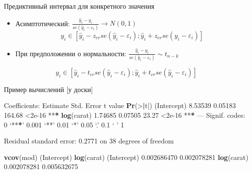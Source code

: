 \documentclass[ignorenonframetext,]{beamer}
\newenvironment{Shaded}{\begin{snugshade}}{\end{snugshade}}
\newcommand{\KeywordTok}[1]{\textcolor[rgb]{0.13,0.29,0.53}{\textbf{{#1}}}}
\newcommand{\DecValTok}[1]{\textcolor[rgb]{0.00,0.00,0.81}{{#1}}}
\newcommand{\FloatTok}[1]{\textcolor[rgb]{0.00,0.00,0.81}{{#1}}}
\newcommand{\StringTok}[1]{\textcolor[rgb]{0.31,0.60,0.02}{{#1}}}
\newcommand{\ErrorTok}[1]{\textbf{{#1}}}
\newcommand{\NormalTok}[1]{{#1}}
\begin{document}
\begin{frame}{Предиктивный интервал для конкретного значения}

\begin{itemize}
\item
  Асимптотический:
  \(\frac{\hat{y}_i - y_i }{se(\hat{y}_i-\varepsilon_i)} \to N(0,1)\) \[
  y_i  \in [\hat{y}_i - z_{cr} se(\hat{y}_i-\varepsilon_i);\hat{y}_i + z_{cr} se(\hat{y}_i-\varepsilon_i) ]
  \]
\item
  При предположении о нормальности:
  \(\frac{\hat{y}_i - y_i }{se(\hat{y}_i-\varepsilon_i)} \sim t_{n-k}\)
\end{itemize}

\[
y_i  \in [\hat{y}_i - t_{cr} se(\hat{y}_i-\varepsilon_i);\hat{y}_i + t_{cr} se(\hat{y}_i-\varepsilon_i) ]
\]

\end{frame}

\begin{frame}[fragile]{Пример вычислений {[}у доски{]}}

\begin{Shaded}
\begin{Highlighting}[]
\NormalTok{Coefficients:}
\StringTok{            }\NormalTok{Estimate Std. Error t value }\KeywordTok{Pr}\NormalTok{(>}\ErrorTok{|}\NormalTok{t|)    }
\NormalTok{(Intercept)  }\FloatTok{8.53539}    \FloatTok{0.05183}  \FloatTok{164.68}   \NormalTok{<}\FloatTok{2e-16} \NormalTok{**}\ErrorTok{*}
\KeywordTok{log}\NormalTok{(carat)   }\FloatTok{1.74685}    \FloatTok{0.07505}   \FloatTok{23.27}   \NormalTok{<}\FloatTok{2e-16} \NormalTok{**}\ErrorTok{*}
\NormalTok{---}
\NormalTok{Signif. codes:}\StringTok{  }\DecValTok{0} \NormalTok{‘**}\ErrorTok{*}\NormalTok{’ }\FloatTok{0.001} \NormalTok{‘**’ }\FloatTok{0.01} \NormalTok{‘*’ }\FloatTok{0.05} \NormalTok{‘.’ }\FloatTok{0.1} \NormalTok{‘ ’ }\DecValTok{1}

\NormalTok{Residual standard error:}\StringTok{ }\FloatTok{0.2771} \NormalTok{on }\DecValTok{38} \NormalTok{degrees of freedom}

\KeywordTok{vcov}\NormalTok{(mod)}
            \NormalTok{(Intercept)  }\KeywordTok{log}\NormalTok{(carat)}
\NormalTok{(Intercept) }\FloatTok{0.002686470} \FloatTok{0.002078281}
\KeywordTok{log}\NormalTok{(carat)  }\FloatTok{0.002078281} \FloatTok{0.005632675}
\end{Highlighting}
\end{Shaded}

\end{frame}
\end{document}
